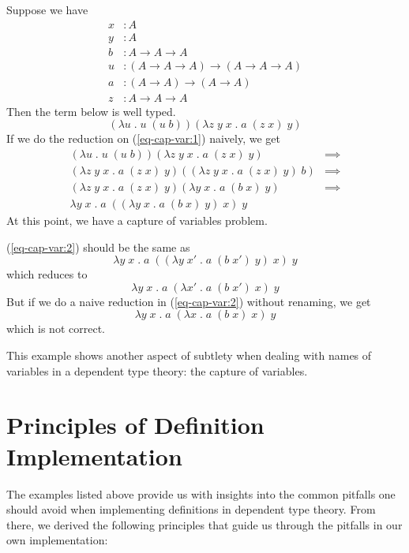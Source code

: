 \begin{example}\label{theory:exa3}
  Suppose we have
  \begin{align*}
    x &: A \\
    y &: A \\
    b &: A \to A \to A \\
    u &: (A \to A \to A) \to (A \to A \to A) \\
    a &: (A \to A) \to (A \to A) \\
    z &: A \to A \to A
  \end{align*}
  Then the term below is well typed.
  \begin{equation} \label{eq-cap-var:1}
    (\lambda u \; . \; u \; (u \; b)) (\lambda z \; y \; x \; . \; a \; (z \; x) \; y)
  \end{equation}
  If we do the reduction on (\ref{eq-cap-var:1}) naively, we get
  \begin{align}
    (\lambda u \; . \; u \; (u \; b)) (\lambda z \; y \; x \; . \; a \; (z \; x) \; y) & \implies \nonumber \\
    (\lambda z \; y \; x \; . \; a \; (z \; x) \; y) ((\lambda z \; y \; x \; . \; a \; (z \; x) \; y) \; b) & \implies \nonumber \\
    (\lambda z \; y \; x \; . \; a \; (z \; x) \; y) (\lambda y \; x \; . \; a \; (b \; x) \; y) & \implies \nonumber \\
    \lambda y \; x \; . \; a \; ((\lambda y \; x \; . \; a \; (b \; x) \; y)\; x) \; y \label{eq-cap-var:2}
  \end{align}
  At this point, we have a capture of variables problem.

  (\ref{eq-cap-var:2}) should be the same as
  \[ \lambda y \; x \; . \; a \; ((\lambda y \; x' \; . \; a \; (b \; x') \; y)\; x) \; y \]
  which reduces to
  \[ \lambda y \; x \; . \; a \; (\lambda x' \; . \; a \; (b \; x') \; x) \; y \]
  But if we do a naive reduction in (\ref{eq-cap-var:2}) without renaming, we get 
  \[ \lambda y \; x \; . \; a \; (\lambda x \; . \; a \; (b \; x) \; x) \; y \]
  which is not correct.

  This example shows another aspect of subtlety when dealing with names of variables in a dependent type theory: the capture of variables.
\end{example}

\section{Principles of Definition Implementation} \label{sec:theory:definition}
The examples listed above provide us with insights into the common pitfalls one should avoid when implementing definitions in dependent type theory. From there, we derived the following principles that guide us through the pitfalls in our own implementation:

